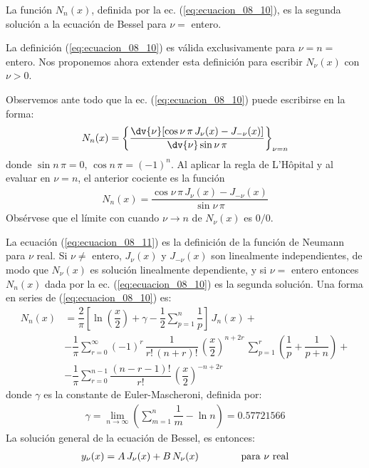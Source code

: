 La función $N_{n}(x)$, definida por la ec. (\ref{eq:ecuacion_08_10}), es la segunda solución a la ecuación de Bessel para $\nu =$ entero.
\par
La definición (\ref{eq:ecuacion_08_10}) es válida exclusivamente para $\nu = n =$ entero. Nos proponemos ahora extender esta definición para escribir $N_{\nu} (x)$ con $\nu > 0$.
\par
Observemos ante todo que la ec. (\ref{eq:ecuacion_08_10}) puede escribirse en la forma:
\begin{align*}
N_{n} (x) =  \left\{ \dfrac{\displaystyle \dv{{\nu}} [\cos \nu \, \pi \, J_{\nu} (x) - J_{-\nu} (x)]}{\displaystyle \dv{\nu} \sin \nu \, \pi} \right\}_{\nu=n}
\end{align*}
donde $\sin n \, \pi = 0$, $\cos n \, \pi = (-1)^{n}$. Al aplicar la regla de L'Hôpital y al evaluar en $\nu = n$, el anterior cociente es la función
\begin{align}
N_{n} (x) = \dfrac{\cos \nu \, \pi \, J_{\nu} (x) - J_{-\nu} (x)}{\sin \nu \, \pi}
\label{eq:ecuacion_08_11}
\end{align}
Obsérvese que el límite con cuando $\nu \to n$ de $N_{\nu} (x)$ es $0/0$.
\par
La ecuación (\ref{eq:ecuacion_08_11}) es la definición de la función de Neumann para $\nu$ real. Si $\nu \neq$ entero, $J_{\nu} (x)$ y $J_{-\nu} (x)$ son linealmente independientes, de modo que $N_{\nu}(x)$ es solución linealmente dependiente, y si $\nu =$ entero entonces $N_{n}(x)$ dada por la ec. (\ref{eq:ecuacion_08_10}) es la segunda solución. Una forma en series de (\ref{eq:ecuacion_08_10}) es:
\begin{align*}
N_{n}(x) &= \dfrac{2}{\pi} \left[ \ln \left(\dfrac{x}{2} \right) + \gamma - \dfrac{1}{2} \sum_{p=1}^{n} \dfrac{1}{p} \right] \, J_{n} (x) + \\[0.5em]
&- \dfrac{1}{\pi} \sum_{r=0}^{\infty} (-1)^{r} \, \dfrac{1}{r! \, (n + r)!} \, \left( \dfrac{x}{2} \right)^{n+2r} \, \sum_{p=1}^{r} \left( \dfrac{1}{p} + \dfrac{1}{p + n} \right) + \\[0.5em]
&- \dfrac{1}{\pi} \sum_{r=0}^{n-1} \dfrac{(n - r - 1)!}{r!} \, \left( \dfrac{x}{2} \right)^{-n+2r}
\end{align*}
donde $\gamma$ es la constante de Euler-Mascheroni, definida por:
\begin{align*}
\gamma = \lim_{n \to \infty} \left( \sum_{m=1}^{n} \dfrac{1}{m} - \ln n \right) = 0.57721566
\end{align*}
La solución general de la ecuación de Bessel, es entonces:
\begin{align*}
y_{\nu} (x) = A \, J_{\nu} (x) + B \, N_{\nu} (x) \hspace{1.5cm} \mbox{para $\nu$ real}
\end{align*}
